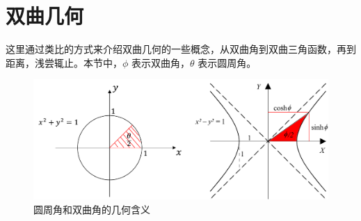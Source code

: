 \documentclass[12pt, a4paper, oneside]{ctexbook}
\begin{document}
\section{双曲几何}

这里通过类比的方式来介绍双曲几何的一些概念，从双曲角到双曲三角函数，再到距离，浅尝辄止。本节中，$\phi$ 表示双曲角，$\theta$ 表示圆周角。

\begin{figure}[H]
	\centering
	\includegraphics[scale=0.4]{figures/hyperbolic_function.pdf}
	\caption{圆周角和双曲角的几何含义}
\end{figure}
\end{document}
